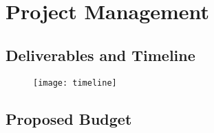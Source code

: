 \clearpage

\section{Project Management}
\label{sec:project-management}

\subsection{Deliverables and Timeline}
\label{sec:timeline}

\begin{figure}[H]
        \centering
        \texttt{[image: timeline]}
\end{figure}

\clearpage

\subsection{Proposed Budget}
\label{sec:budget}

